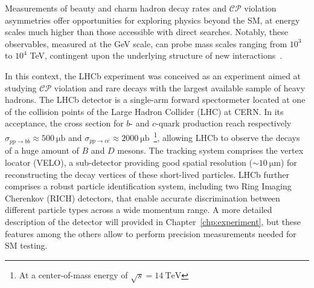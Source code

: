 Measurements of beauty and charm hadron decay rates and $\mathcal{CP}$ violation asymmetries offer opportunities for exploring physics beyond the SM, at energy scales much higher than those accessible with direct searches. Notably, these observables, measured at the GeV scale, can probe mass scales ranging from $10^3$ to $10^4$ TeV, contingent upon the underlying structure of new interactions~\cite{Isidori_2010}. 

In this context, the LHCb experiment was conceived as an experiment aimed at studying $\mathcal{CP}$ violation and rare decays with the largest available sample of heavy hadrons. The LHCb detector is a single-arm forward spectormeter located at one of the collision points of the Large Hadron Collider (LHC) at CERN. In its acceptance, the cross section for $b$- and $c$-quark production reach respectively $\sigma_{pp\rightarrow b\bar{b}}\approx\SI{500}{\micro\barn}$ and $\sigma_{pp\rightarrow c\bar{c}}\approx\SI{2000}{\micro\barn}$~\cite{bCrossSection, Aaij:2057627}\footnote{At a center-of-mass energy of $\sqrt{s}=\SI{14}{\tera\eV}$}, allowing LHCb to observe the decays of a huge amount of $B$ and $D$ mesons. The tracking system comprises the vertex locator (VELO), a sub-detector providing good spatial resolution ($\sim \SI{10}{\micro\meter}$) for reconstructing the decay vertices of these short-lived particles. LHCb further comprises a robust particle identification system, including two Ring Imaging Cherenkov (RICH) detectors, that enable accurate discrimination between different particle types across a wide momentum range. A more detailed description of the detector will provided in Chapter~\ref{chp:experiment}, but these features among the others allow to perform precision measurements needed for SM testing.


